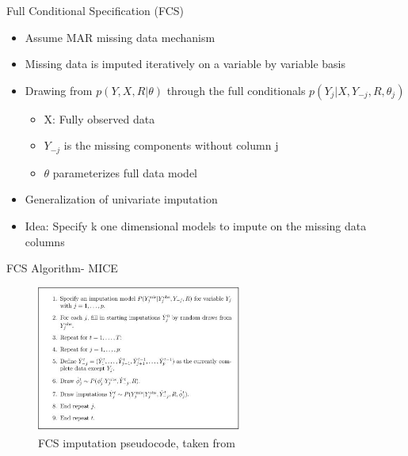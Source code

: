 \begin{frame}{Full Conditional Specification (FCS)}
 \begin{itemize}
  \item Assume MAR missing data mechanism %
  \item Missing data is imputed iteratively on a variable by variable basis
  \item Drawing from $p(Y,X,R|\theta)$ through the full conditionals $p(Y_j|X,Y_{-j},R,\theta_j)$
  \begin{itemize}
   \item X: Fully observed data
   \item $Y_{-j}$ is the missing components without column j
   \item $\theta$ parameterizes full data model
  \end{itemize}

  \item Generalization of univariate imputation
  \item Idea: Specify k one dimensional models to impute on the missing data columns
 \end{itemize}

\end{frame}

\begin{frame}{FCS Algorithm- MICE}
  \begin{figure}[h!]
  \centering
    \includegraphics[width=0.6\textwidth]{fcs_algo}
  \caption{FCS imputation pseudocode, taken from \cite{VanBuuren2012}}
\label{fig:fcsexample}
\end{figure}
\end{frame}

